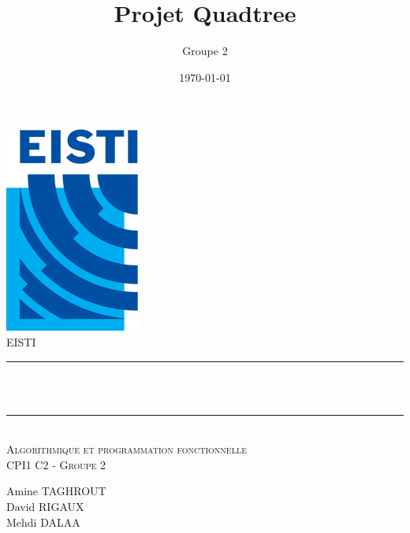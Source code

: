 \documentclass[12pt]{article}
\title{Projet Quadtree}								%
\author{Groupe 2}								%
\date{\today}											%
\makeatletter
\let\thetitle\@title
\let\thedate\@date
\makeatother
\begin{document}

\begin{titlepage}
	\centering
    \vspace*{0.5 cm}
    \includegraphics[scale = 0.75 ]{logo1.png}\\[1.0 cm]	%
    \textsc{\LARGE EISTI}\\[2.0 cm]			%
    \rule{\linewidth}{0.2 mm} \\[0.5 cm]
    { \huge \bfseries \thetitle}\\
    \rule{\linewidth}{0.2 mm} \\[1.5 cm]
	\textsc{\Large Algorithmique et programmation fonctionnelle}\\[0.5 cm]	%
	\textsc{\large CPI1 C2 - Groupe 2}\\[0.5 cm]		%
	
	\begin{minipage}{0.4\textwidth}
	\centering
		\begin{center} \large
		Amine TAGHROUT\\
		David RIGAUX \\
		Mehdi DALAA 
			\end{center}
			\end{minipage}~
			\begin{minipage}{0.4\textwidth}
	\end{minipage}\\[0.8 cm]
	{\large \thedate}\\[1 cm]
	\vfill
	
\end{titlepage}


\tableofcontents
{}
\pagebreak
\end{document}

